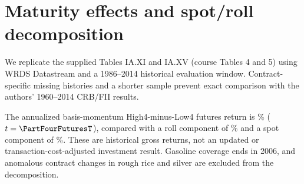 
\section{Maturity effects and spot/roll decomposition}
We replicate the supplied Tables IA.XI and IA.XV (course Tables 4 and 5)
using WRDS Datastream and a 1986--2014 historical evaluation window.
Contract-specific missing histories and a shorter sample prevent exact
comparison with the authors' 1960--2014 CRB/FII results.

\begin{table}[htbp]
\centering
\caption{Basis-momentum across the curve. The table compares equal-weight
High4-minus-Low4 returns at different nearby maturities. Conditional rows use
same-side portfolio agreement of at most three commodities; unsigned-overlap
sensitivity results are exported separately. Annual means are in percent;
t statistics use monthly iid standard errors. Per-cell sample counts differ
when selected contracts cannot be repriced.}
\resizebox{\textwidth}{!}{}
\end{table}

\begin{table}[htbp]
\centering
\caption{Spot and roll decomposition. In the substituted WRDS sample,
the basis-momentum return differential is associated primarily with the roll
component; the spot differential is negative. Components are calculated
per commodity before averaging, with identical evaluation months across
groups. The spot component is a residual rather than observed physical spot
returns. The multiplicative interaction is retained in the audit outputs.}
\resizebox{\textwidth}{!}{}
\end{table}

The annualized basis-momentum High4-minus-Low4 futures return is
\PartFourFutures\% ($t=\PartFourFuturesT$), compared with a roll component of
\PartFourRoll\% and a spot component of \PartFourSpot\%.
These are historical gross returns, not an updated or transaction-cost-adjusted
investment result. Gasoline coverage ends in 2006, and anomalous contract
changes in rough rice and silver are excluded from the decomposition.
